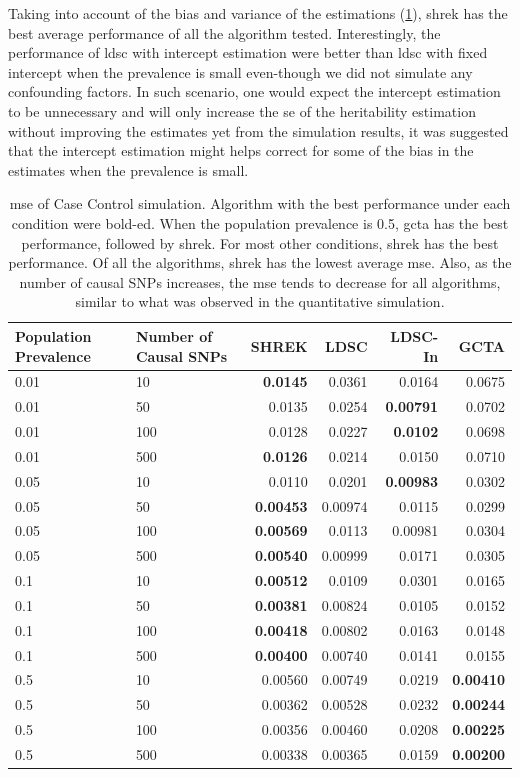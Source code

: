 		
		Taking into account of the bias and variance of the estimations (\cref{tab:mseCC}), \gls{shrek} has the best average performance of all the algorithm tested.
		Interestingly, the performance of \gls{ldsc} with intercept estimation were better than \gls{ldsc} with fixed intercept when the prevalence is small even-though we did not simulate any confounding factors.
		In such scenario, one would expect the intercept estimation to be unnecessary and will only increase the \gls{se} of the heritability estimation without improving the estimates yet from the simulation results, it was suggested that the intercept estimation might helps correct for some of the bias in the estimates when the prevalence is small.
\begin{table}
	\centering
	\begin{tabular}{p{2cm}p{2.4cm}rrrr}
		\toprule
		Population Prevalence&	Number of Causal SNPs&	SHREK&	LDSC&	LDSC-In&	GCTA \\
		\midrule
		0.01&	10&	\textbf{0.0145}&	0.0361&	0.0164&	0.0675\\
		0.01&	50&	0.0135&	0.0254&	\textbf{0.00791}&	0.0702\\
		0.01&	100&	0.0128&	0.0227&	\textbf{0.0102}&	0.0698\\
		0.01&	500&	\textbf{0.0126}&	0.0214&	0.0150&	0.0710\\
		0.05&	10&	0.0110&	0.0201&	\textbf{0.00983}&	0.0302\\
		0.05&	50&	\textbf{0.00453}&	0.00974&	0.0115&	0.0299\\
		0.05&	100&	\textbf{0.00569}&	0.0113&	0.00981&	0.0304\\
		0.05&	500&	\textbf{0.00540}&	0.00999&	0.0171&	0.0305\\
		0.1&	10&	\textbf{0.00512}&	0.0109&	0.0301&	0.0165\\
		0.1&	50&	\textbf{0.00381}&	0.00824&	0.0105&	0.0152\\
		0.1&	100&	\textbf{0.00418}&	0.00802&	0.0163&	0.0148\\
		0.1&	500&	\textbf{0.00400}&	0.00740&	0.0141&	0.0155\\
		0.5&	10&	0.00560&	0.00749&	0.0219&	\textbf{0.00410}\\
		0.5&	50&	0.00362&	0.00528&	0.0232&	\textbf{0.00244}\\
		0.5&	100&	0.00356&	0.00460&	0.0208&	\textbf{0.00225}\\
		0.5&	500&	0.00338&	0.00365&	0.0159&	\textbf{0.00200}\\
		\bottomrule
	\end{tabular}
	\caption[MSE of Case Control Simulation]{
		\Gls{mse} of Case Control simulation.
		Algorithm with the best performance under each condition were bold-ed.
		When the population prevalence is 0.5, \gls{gcta} has the best performance, followed by \gls{shrek}.
		For most other conditions, \gls{shrek} has the best performance. 
		Of all the algorithms, \gls{shrek} has the lowest average \gls{mse}.
		Also, as the number of causal \glspl{SNP} increases, the \gls{mse} tends to decrease for all algorithms, similar to what was observed in the quantitative simulation. 
	}
	\label{tab:mseCC}
\end{table}

